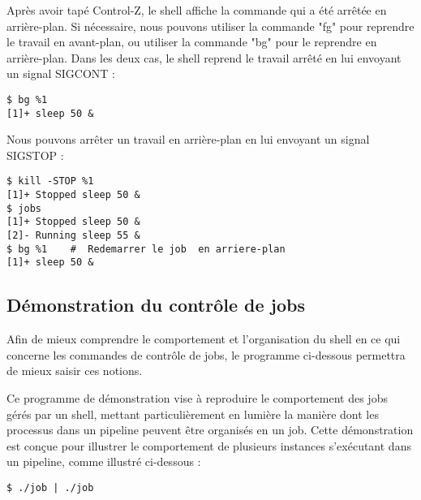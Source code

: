 Après avoir tapé Control-Z, le shell affiche la commande qui a été arrêtée en arrière-plan. Si nécessaire, nous pouvons utiliser la commande "fg"
pour reprendre le travail en avant-plan, ou utiliser la commande "bg" pour le reprendre en arrière-plan. Dans les deux cas, le shell reprend le travail 
arrêté en lui envoyant un signal SIGCONT :
\begin{lstlisting}[style=blackstyle]
$ bg %1
[1]+ sleep 50 &  
\end{lstlisting}

Nous pouvons arrêter un travail en arrière-plan en lui envoyant un signal SIGSTOP :

\begin{lstlisting}[style=blackstyle]
$ kill -STOP %1
[1]+ Stopped sleep 50 & 
$ jobs
[1]+ Stopped sleep 50 & 
[2]- Running sleep 55 &
$ bg %1    #  Redemarrer le job  en arriere-plan
[1]+ sleep 50 & 
\end{lstlisting}


\subsection{Démonstration du contrôle de jobs}

Afin de mieux comprendre le comportement et l'organisation du shell en ce qui concerne les commandes de contrôle de jobs, le programme ci-dessous permettra de mieux saisir ces notions.

Ce programme de démonstration vise à reproduire le comportement des jobs gérés par un shell, mettant particulièrement en lumière la manière dont les processus dans un pipeline peuvent être organisés en un job.
Cette démonstration est conçue pour illustrer le comportement de plusieurs instances s'exécutant dans un pipeline, comme illustré ci-dessous :


\begin{lstlisting}[style=blackstyle]
$ ./job | ./job 
\end{lstlisting}


